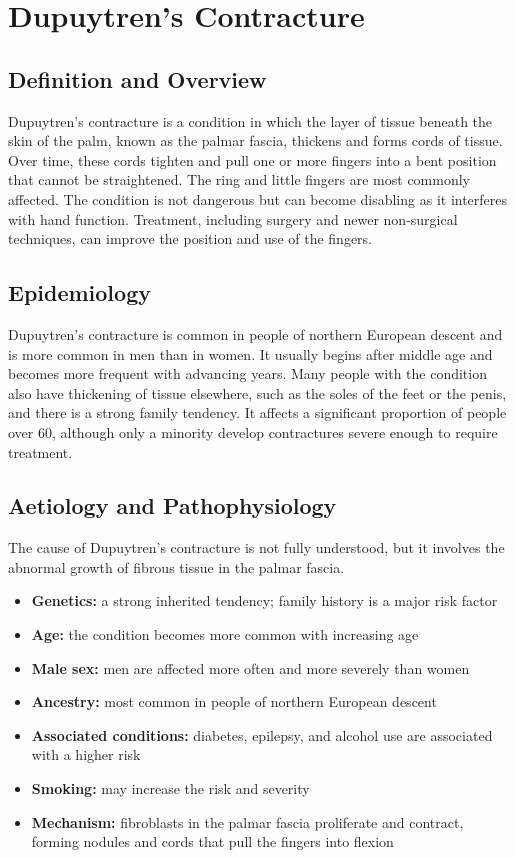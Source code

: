 \chapter{Dupuytren's Contracture}

\section*{Definition and Overview}
Dupuytren's contracture is a condition in which the layer of tissue beneath the skin of the palm, known as the palmar fascia, thickens and forms cords of tissue. Over time, these cords tighten and pull one or more fingers into a bent position that cannot be straightened. The ring and little fingers are most commonly affected. The condition is not dangerous but can become disabling as it interferes with hand function. Treatment, including surgery and newer non-surgical techniques, can improve the position and use of the fingers.

\section*{Epidemiology}
Dupuytren's contracture is common in people of northern European descent and is more common in men than in women. It usually begins after middle age and becomes more frequent with advancing years. Many people with the condition also have thickening of tissue elsewhere, such as the soles of the feet or the penis, and there is a strong family tendency. It affects a significant proportion of people over 60, although only a minority develop contractures severe enough to require treatment.

\section*{Aetiology and Pathophysiology}
The cause of Dupuytren's contracture is not fully understood, but it involves the abnormal growth of fibrous tissue in the palmar fascia.
\begin{itemize}
    \item \textbf{Genetics:} a strong inherited tendency; family history is a major risk factor
    \item \textbf{Age:} the condition becomes more common with increasing age
    \item \textbf{Male sex:} men are affected more often and more severely than women
    \item \textbf{Ancestry:} most common in people of northern European descent
    \item \textbf{Associated conditions:} diabetes, epilepsy, and alcohol use are associated with a higher risk
    \item \textbf{Smoking:} may increase the risk and severity
    \item \textbf{Mechanism:} fibroblasts in the palmar fascia proliferate and contract, forming nodules and cords that pull the fingers into flexion
\end{itemize}

